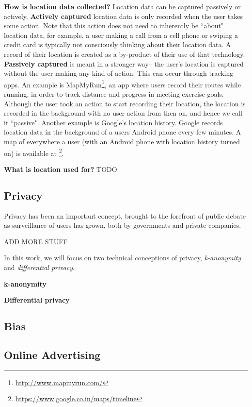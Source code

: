 \textbf{How is location data collected?}
Location data can be captured passively or actively.
\textbf{Actively captured} location data is only recorded when the user takes some action.
Note that this action does not need to inherently be ``about" location data, for example, a user making a call from a cell phone or swiping a credit card is typically not consciously thinking about their location data. 
A record of their location is created as a by-product of their use of that technology.
\textbf{Passively captured} is meant in a stronger way-- the user's location is captured without the user making any kind of action.
This can occur through tracking apps.
An example is MapMyRun\footnote{\url{http://www.mapmyrun.com/}}, an app where users record their routes while running, in order to track distance and progress in meeting exercise goals.
Although the user took an action to start recording their location, the location is recorded in the background with no user action from then on, and hence we call it ``passive".
Another example is Google's location history.
Google records location data in the background of a users Android phone every few minutes.
A map of everywhere a user (with an Android phone with location history turned on) is available at \footnote{\url{https://www.google.co.in/maps/timeline}}.

\textbf{What is location used for?}
TODO



\subsection{Privacy}
\label{ssec:privacy}
Privacy has been an important concept, brought to the forefront of public debate as surveillance of users has grown, both by governments and private companies.

ADD MORE STUFF

In this work, we will focus on two technical conceptions of privacy, \emph{k-anonymity} and \emph{differential privacy}.

\textbf{k-anonymity} 

\textbf{Differential privacy}


\subsection{Bias}

\subsection{Online Advertising}

